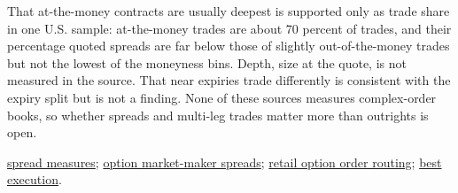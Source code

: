 \begin{qfmethod}
 That at-the-money contracts are usually deepest is supported only as trade share in one U.S. sample: at-the-money trades are about 70 percent of trades, and their percentage quoted spreads are far below those of slightly out-of-the-money trades but not the lowest of the moneyness bins. Depth, size at the quote, is not measured in the source. That near expiries trade differently is consistent with the expiry split but is not a finding. None of these sources measures complex-order books, so whether spreads and multi-leg trades matter more than outrights is open.

 \hyperref[def:spread-measures]{spread measures}; \hyperref[res:option-market-maker-spreads]{option market-maker spreads}; \hyperref[mech:options-retail-wholesaler-routing]{retail option order routing}; \hyperref[def:best-execution]{best execution}.

\end{qfmethod}


